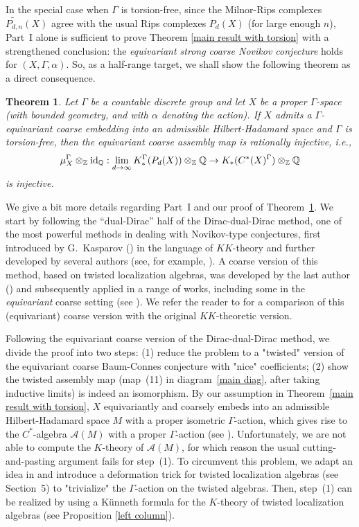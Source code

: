 \documentclass[11pt]{article}
\theoremstyle{definition}
\theoremstyle{plain}
\newtheorem{Thm}[Def]{Theorem}
\def\A{\mathcal A}\def\C{\mathcal C}\def\B{\mathcal B}\def\E{\mathcal E}\def\O{\mathcal O}\def\h{\mathfrak h}\def\K{\mathcal K}\def\F{\mathcal F}\def\P{\mathcal P}\def\L{\mathcal L}\def\R{\mathcal R}\def\Q{\mathcal Q}\def\H{\mathcal H}\def\S{\mathcal S}\def\N{\mathcal N}\def\U{\mathcal U}\def\V{\mathcal V}
\def\MRdnX{\widetilde{P_{d,n}}(X)}
\def\ox{\otimes}
\def\ox{\otimes}
\def\Ga{\Gamma}
\begin{document}
In the special case when $\Ga$ is torsion-free, 
since the Milnor-Rips complexes $\MRdnX$ agree with the usual Rips complexes $P_d(X)$ (for large enough $n$), Part~I alone is sufficient to prove Theorem \ref{main result with torsion} with a strengthened conclusion: the \emph{equivariant strong coarse Novikov conjecture} holds for $(X,\Ga,\alpha)$. So, as a half-range target, we shall show the following theorem as a direct consequence.

\begin{Thm}\label{main result torsion-free}
	Let $\Gamma$ be a countable discrete group and let $X$ be a proper $\Gamma$-space (with bounded geometry, and with $\alpha$ denoting the action). 
    If $X$ admits a $\Ga$-equivariant coarse embedding into an admissible Hilbert-Hadamard space and $\Ga$ is torsion-free, 
	then the equivariant coarse assembly map is rationally injective, i.e.,
$$\mu_{X}^{\Ga}\ox_{\IZ}\operatorname{id}_{\IQ}:\lim_{d\to\infty}K^{\Ga}_*(P_d(X))\ox_{\IZ}\IQ\to K_*(C^*(X)^{\Ga})\ox_{\IZ}\IQ$$
is injective.
\end{Thm}  

We give a bit more details regarding Part~I and  
our proof of Theorem~\ref{main result torsion-free}. We start by following the ``dual-Dirac'' half of the Dirac-dual-Dirac method, 
one of the most powerful methods in dealing with Novikov-type conjectures, first introduced by G.~Kasparov (\cite{Kas88}) in the language of $KK$-theory and further developed by several authors (see, for example, \cite{KS1991, Tu1999, KS2003, GHT2000, HK2001, CE2001}). 
A coarse version of this method, based on twisted localization algebras, was developed by the last author (\cite{Yu2000}) and subsequently applied in a range of works, including some in the \emph{equivariant} coarse setting (see \cite{FW2016,FWY2020}). 
We refer the reader to \cite{GW2022} for a comparison of this (equivariant) coarse version with the original $KK$-theoretic version. 

Following the equivariant coarse version of the Dirac-dual-Dirac method, we divide the proof into two steps: (1) reduce the problem to a "twisted" version of the equivariant coarse Baum-Connes conjecture with "nice" coefficients; (2) show the twisted assembly map (map~(11) in diagram~\eqref{main diag}, after taking inductive limits) is indeed an isomorphism. 
By our assumption in Theorem~\ref{main result with torsion}, $X$ equivariantly and coarsely embeds into an admissible Hilbert-Hadamard space $M$ with a proper isometric $\Ga$-action, which gives rise to the $C^*$-algebra $\A(M)$ with a proper $\Ga$-action (see \cite[Section~5]{GWY2018}). Unfortunately, we are not able to compute the $K$-theory of $\A(M)$, for which reason the usual cutting-and-pasting argument fails for step~(1). To circumvent this problem, we adapt an idea in \cite{GWY2018} and introduce a deformation trick for twisted localization algebras (see Section~5) to "trivialize" the $\Ga$-action on the twisted algebras. Then, step~(1) can be realized by using a K\"unneth formula for the $K$-theory of twisted localization algebras (see Proposition \ref{left column}).
\end{document}
